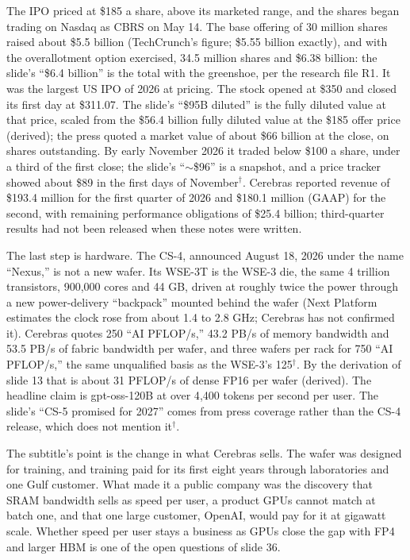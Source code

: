 \documentclass[11pt,letterpaper]{article}
\begin{document}
The IPO priced at \$185 a share, above its marketed range, and the shares began trading on Nasdaq as CBRS on May 14. The base offering of 30 million shares raised about \$5.5 billion (TechCrunch's figure; \$5.55 billion exactly), and with the overallotment option exercised, 34.5 million shares and \$6.38 billion: the slide's ``\$6.4 billion'' is the total with the greenshoe, per the research file R1. It was the largest US IPO of 2026 at pricing. The stock opened at \$350 and closed its first day at \$311.07. The slide's ``\$95B diluted'' is the fully diluted value at that price, scaled from the \$56.4 billion fully diluted value at the \$185 offer price (derived); the press quoted a market value of about \$66 billion at the close, on shares outstanding. By early November 2026 it traded below \$100 a share, under a third of the first close; the slide's ``${\sim}$\$96'' is a snapshot, and a price tracker showed about \$89 in the first days of November$^\dagger$. Cerebras reported revenue of \$193.4 million for the first quarter of 2026 and \$180.1 million (GAAP) for the second, with remaining performance obligations of \$25.4 billion; third-quarter results had not been released when these notes were written.

The last step is hardware. The CS-4, announced August 18, 2026 under the name ``Nexus,'' is not a new wafer. Its WSE-3T is the WSE-3 die, the same 4 trillion transistors, 900{,}000 cores and 44 GB, driven at roughly twice the power through a new power-delivery ``backpack'' mounted behind the wafer (Next Platform estimates the clock rose from about 1.4 to 2.8 GHz; Cerebras has not confirmed it). Cerebras quotes 250 ``AI PFLOP/s,'' 43.2 PB/s of memory bandwidth and 53.5 PB/s of fabric bandwidth per wafer, and three wafers per rack for 750 ``AI PFLOP/s,'' the same unqualified basis as the WSE-3's 125$^\dagger$. By the derivation of slide 13 that is about 31 PFLOP/s of dense FP16 per wafer (derived). The headline claim is gpt-oss-120B at over 4{,}400 tokens per second per user. The slide's ``CS-5 promised for 2027'' comes from press coverage rather than the CS-4 release, which does not mention it$^\dagger$.

The subtitle's point is the change in what Cerebras sells. The wafer was designed for training, and training paid for its first eight years through laboratories and one Gulf customer. What made it a public company was the discovery that SRAM bandwidth sells as speed per user, a product GPUs cannot match at batch one, and that one large customer, OpenAI, would pay for it at gigawatt scale. Whether speed per user stays a business as GPUs close the gap with FP4 and larger HBM is one of the open questions of slide 36.
\end{document}
